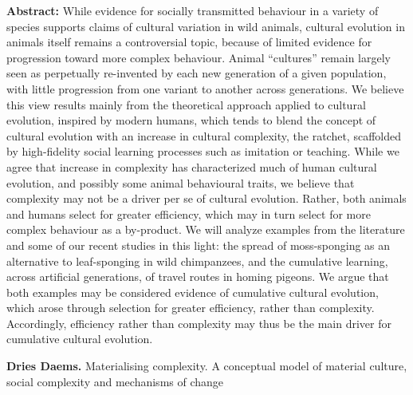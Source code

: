 \documentclass[]{article}
\begin{document}
\textbf{Abstract:} While evidence for socially transmitted behaviour in
a variety of species supports claims of cultural variation in wild
animals, cultural evolution in animals itself remains a controversial
topic, because of limited evidence for progression toward more complex
behaviour. Animal ``cultures'' remain largely seen as perpetually
re-invented by each new generation of a given population, with little
progression from one variant to another across generations. We believe
this view results mainly from the theoretical approach applied to
cultural evolution, inspired by modern humans, which tends to blend the
concept of cultural evolution with an increase in cultural complexity,
the ratchet, scaffolded by high-fidelity social learning processes such
as imitation or teaching. While we agree that increase in complexity has
characterized much of human cultural evolution, and possibly some animal
behavioural traits, we believe that complexity may not be a driver per
se of cultural evolution. Rather, both animals and humans select for
greater efficiency, which may in turn select for more complex behaviour
as a by-product. We will analyze examples from the literature and some
of our recent studies in this light: the spread of moss-sponging as an
alternative to leaf-sponging in wild chimpanzees, and the cumulative
learning, across artificial generations, of travel routes in homing
pigeons. We argue that both examples may be considered evidence of
cumulative cultural evolution, which arose through selection for greater
efficiency, rather than complexity. Accordingly, efficiency rather than
complexity may thus be the main driver for cumulative cultural
evolution.

{\bf Dries Daems. }{Materialising complexity. A conceptual model of material
culture, social complexity and mechanisms of change}
\end{document}
